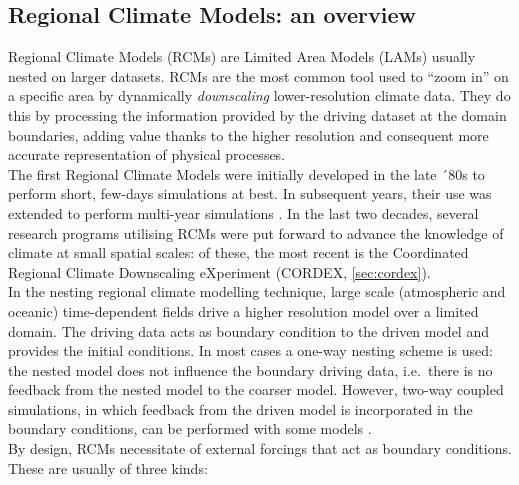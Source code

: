 \subsection{Regional Climate Models: an overview}
Regional Climate Models (RCMs) are Limited Area Models (LAMs) usually nested on larger datasets. RCMs are the most common tool used to ``zoom in'' on a specific area by dynamically \emph{downscaling} lower-resolution climate data. They do this by processing the information provided by the driving dataset at the domain boundaries, adding value thanks to the higher resolution and consequent more accurate representation of physical processes.\\
The first Regional Climate Models were initially developed in the late ´80s \citep{Giorgi1990, dickinson1989regional, Giorgi1989} to perform short, few-days simulations at best. In subsequent years, their use was extended to perform multi-year simulations \citep{Giorgi1993, Jones1995}. In the last two decades, several research programs utilising RCMs were put forward to advance the knowledge of climate at small spatial scales: of these, the most recent is the Coordinated Regional Climate Downscaling eXperiment (CORDEX, \cref{sec:cordex}).\\
In the nesting regional climate modelling technique, large scale (atmospheric and oceanic) time-dependent fields drive a higher resolution model over a limited domain. The driving data acts as boundary condition to the driven model and provides the initial conditions. In most cases a one-way nesting scheme is used: the nested model does not influence the boundary driving data, i.e.\ there is no feedback from the nested model to the coarser model. However, two-way coupled simulations, in which feedback from the driven model is incorporated in the boundary conditions, can be performed with some models \citep{Inatsu2009, Lorenz2005}.\\
By design, RCMs necessitate of external forcings that act as boundary conditions. These are usually of three kinds:
